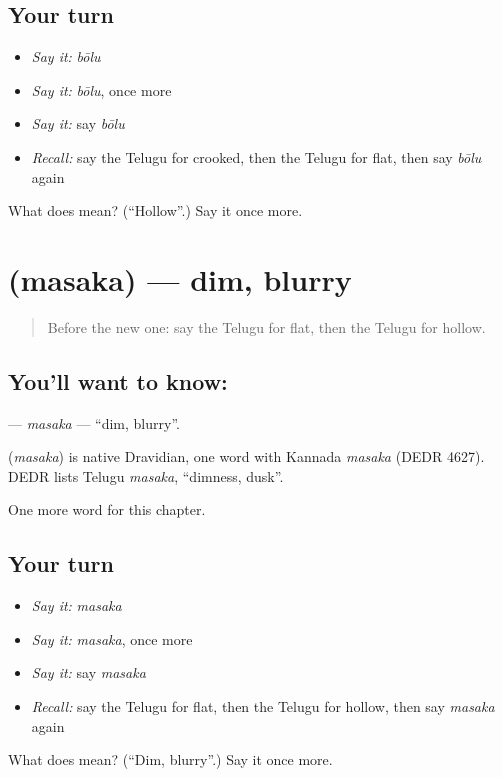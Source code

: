 \subsection*{Your turn}
\begin{itemize}
\raggedright
  \item \emph{Say it:} \emph{bōlu}
  \item \emph{Say it:} \emph{bōlu}, once more
  \item \emph{Say it:} say \emph{bōlu}
  \item \emph{Recall:} say the Telugu for crooked, then the Telugu for flat, then say \emph{bōlu} again
\end{itemize}

\begin{tcolorbox}[breakable,colback=teal!4,colframe=teal!35!black,title={Before you move on}]
What does  mean? (\textquotedblleft{}Hollow\textquotedblright{}.) Say it once more.
\end{tcolorbox}
\section[\texorpdfstring{\te{మసక} (masaka)}{మసక (masaka)}]{ (masaka) — dim, blurry}

\label{lesson:TE-C298-masaka}



\begin{quote}
Before the new one: say the Telugu for flat, then the Telugu for hollow.
\end{quote}

\subsection*{You'll want to know: }
\textbf{} — \emph{masaka} — \textquotedblleft{}dim, blurry\textquotedblright{}.

\begin{cousinweb}
\textbf{} (\emph{masaka}) is native Dravidian, one word with Kannada \emph{masaka} (DEDR 4627). DEDR lists Telugu \emph{masaka}, \textquotedblleft{}dimness, dusk\textquotedblright{}.
\end{cousinweb}

\begin{grammarlens}[title={What you've built}]
One more word for this chapter.
\end{grammarlens}

\subsection*{Your turn}
\begin{itemize}
\raggedright
  \item \emph{Say it:} \emph{masaka}
  \item \emph{Say it:} \emph{masaka}, once more
  \item \emph{Say it:} say \emph{masaka}
  \item \emph{Recall:} say the Telugu for flat, then the Telugu for hollow, then say \emph{masaka} again
\end{itemize}

\begin{tcolorbox}[breakable,colback=teal!4,colframe=teal!35!black,title={Before you move on}]
What does  mean? (\textquotedblleft{}Dim, blurry\textquotedblright{}.) Say it once more.
\end{tcolorbox}
